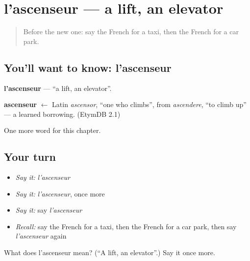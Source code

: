 \section[l'ascenseur]{l'ascenseur — a lift, an elevator}

\label{lesson:FR-C106-ascenseur}



\begin{quote}
Before the new one: say the French for a taxi, then the French for a car park.
\end{quote}

\subsection*{You'll want to know: l'ascenseur}
\textbf{l'ascenseur} — \textquotedblleft{}a lift, an elevator\textquotedblright{}.

\begin{cousinweb}
\textbf{ascenseur} $\leftarrow$ Latin \emph{ascensor}, \textquotedblleft{}one who climbs\textquotedblright{}, from \emph{ascendere}, \textquotedblleft{}to climb up\textquotedblright{} — a learned borrowing. (EtymDB 2.1)
\end{cousinweb}

\begin{grammarlens}[title={What you've built}]
One more word for this chapter.
\end{grammarlens}

\subsection*{Your turn}
\begin{itemize}
\raggedright
  \item \emph{Say it:} \emph{l'ascenseur}
  \item \emph{Say it:} \emph{l'ascenseur}, once more
  \item \emph{Say it:} say \emph{l'ascenseur}
  \item \emph{Recall:} say the French for a taxi, then the French for a car park, then say \emph{l'ascenseur} again
\end{itemize}

\begin{tcolorbox}[breakable,colback=teal!4,colframe=teal!35!black,title={Before you move on}]
What does l'ascenseur mean? (\textquotedblleft{}A lift, an elevator\textquotedblright{}.) Say it once more.
\end{tcolorbox}
